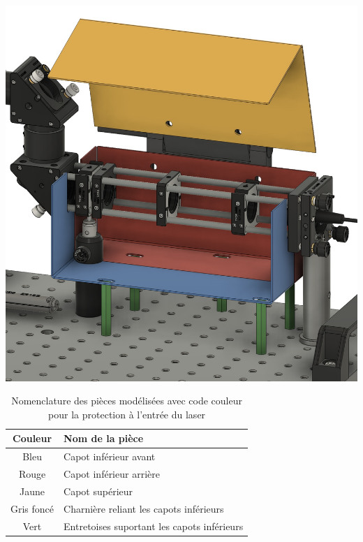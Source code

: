 \begin{minipage}[c]{0.48\textwidth}
    \begin{center}
        \includegraphics[width=\textwidth]{assets/figures/Protections_laser/Securite_mecanique/Protection_entree_laser/model_3D_ouvert.jpeg}
    \end{center}
    \label{model_3D_ouvert}
\end{minipage}

\begin{table}[H]
    \centering
    \caption{Nomenclature des pièces modélisées avec code couleur pour la protection à l'entrée du laser}
    \begin{tabular}{|c|l|}
        \hline
        \textbf{Couleur}                           & \textbf{Nom de la pièce}                    \\
        \hline
        \textcolor[RGB]{88, 122, 163}{Bleu}        & Capot inférieur avant                       \\
        \textcolor[RGB]{170, 80, 70}{Rouge}        & Capot inférieur arrière                     \\
        \textcolor[RGB]{233, 173, 56}{Jaune}       & Capot supérieur                             \\
        \textcolor[RGB]{100, 100, 100}{Gris foncé} & Charnière reliant les capots inférieurs     \\
        \textcolor[RGB]{70, 170, 70}{Vert}         & Entretoises suportant les capots inférieurs \\
        \hline
    \end{tabular}
    \label{tab:nomenclature_pieces_laser}
\end{table}

